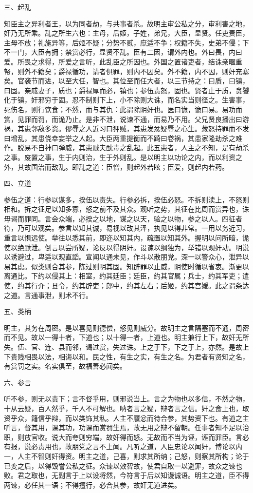 \documentclass[]{article}
\begin{document}
三、起乱

知臣主之异利者王，以为同者劫，与共事者杀。故明主审公私之分，审利害之地，奸乃无所乘。乱之所生六也：主母，后姬，子姓，弟兄，大臣，显贤。任吏责臣，主母不放；礼施异等，后姬不疑；分势不贰，庶适不争；权籍不失，史弟不侵；下不一门，大臣有拥；禁赏必行，显贤不乱。臣有二因，谓外内也。外曰畏，内曰爱。所畏之求得，所爱之言听，此乱臣之所因也。外国之置诸吏者，结诛亲暱重帑，则外不籍矣；爵禄循功，请者俱罪，则内不因矣。外不籍，内不因，则奸充塞矣。官袭节而进，以至大任，智也。其位至而任大者，以三节持之：曰质，曰镇，曰固。亲戚妻子，质也；爵禄厚而必，镇也；参伍责怒，固也。贤者止于质，贪饕化于镇，奸邪穷于固。忍不制则下上，小不除则大诛，而名实当则径之。生害事，死伤名，则行饮食；不然，而与其仇：此谓除阴奸也。医曰诡，诡曰易。易功而赏，见罪而罚，而诡乃止。是非不泄，说谏不通，而易乃不用。父兄贤良播出曰游祸，其患邻敌多资。僇辱之人近习曰狎贼，其患发忿疑辱之心生。藏怒持罪而不发曰增乱，其患侥幸妄举之人起。大臣两重提衡而不踦曰卷祸，其患家隆劫杀之难作。脱易不自神曰弹威，其患贼夫酖毒之乱起。此五患者，人主之不知，是有劫杀之事。废置之事，生于内则治，生于外则乱。是以明主以功论之内，而以利资之外，其故国治而敌乱。即乱之道：臣憎，则起外若眩；臣爱，则起内若药。

四、立道

参伍之道：行参以谋多，揆伍以责失。行参必拆，揆伍必怒。不拆则渎上，不怒则相和。拆之征足以知多寡，怒之前不及其众。观听之势，其征在比周而赏异也，诛毋谒而罪同。言会众端，必揆之以地，谋之以天，验之以物，参之以人。四征者符，乃可以观矣。参言以知其诚，易视以改其泽，执见以得非常。一用以务近习，重言以惧远使。举往以悉其前，即迩以知其内，疏置以知其外。握明以问所暗，诡使以绝黩泄。倒言以尝所疑，论反以得阴奸。设谏以纲独为，举错以观奸动。明说以诱避过，卑适以观直謟。宣闻以通未见，作斗以散朋党。深一以警众心，泄异以易其虑。似类则合其参，陈过则明其固。知辟罪以止威，阴使时循以省衷。渐更以离通比。下约以侵其上：相室，约其廷臣；廷臣，约其官属；兵士，约其军吏；遣使，约其行介；县令，约其辟吏；郎中，约其左右；后姬，约其宫媛。此之谓条达之道。言通事泄，则术不行。

五、类柄

明主，其务在周密。是以喜见则德偿，怒见则威分。故明主之言隔塞而不通，周密而不见。故以一得十者，下道也；以十得一者，上道也。明主兼行上下，故奸无所失。伍、官、连、县而邻，谒过赏，失过诛。上之于下，下之于上，亦然。是故上下贵贱相畏以法，相诲以和。民之性，有生之实，有生之名。为君者有贤知之名，有赏罚之实。名实俱至，故福善必闻矣。

六、参言

听不参，则无以责下；言不督乎用，则邪说当上。言之为物也以多信，不然之物，十从云疑，百人然乎，千人不可解也。呐者言之疑，辩者言之信。奸之食上也，取资乎众，籍信乎辩，而以类饰其私。人主不餍忿而待合参，其势资下也。有道之主听言，督其用，课其功，功课而赏罚生焉，故无用之辩不留朝。任事者知不足以治职，则放官收。说大而夸则穷端，故奸得而怒。无故而不当为诬，诬而罪臣。言必有报，说必责用也，故朋党之言不上闻。凡听之道，人臣忠论以闻奸，博论以内一，人主不智则奸得资。明主之道，己喜，则求其所纳；己怒，则察其所构；论于已变之后，以得毁誉公私之征。众谏以效智故，使君自取一以避罪，故众之谏也败。君之取也，无副言于上以设将然，今符言于后以知谩诚语。明主之道，臣不得两谏，必任其一语；不得擅行，必合其参，故奸无道进矣。
\end{document}
